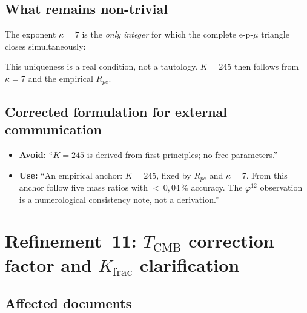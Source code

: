 \subsection*{What remains non-trivial}

The exponent $\kappa = 7$ is the \emph{only integer} for which the complete
e-p-$\mu$ triangle closes simultaneously:
\begin{center}
{\footnotesize
{}
}
\end{center}
This uniqueness is a real condition, not a tautology. $K = 245$ then follows
from $\kappa = 7$ and the empirical $R_{pe}$.

\subsection*{Corrected formulation for external communication}

\begin{itemize}
  \item \textbf{Avoid:} \enquote{$K = 245$ is derived from first principles;
        no free parameters.}
  \item \textbf{Use:} \enquote{An empirical anchor: $K = 245$, fixed by
        $R_{pe}$ and $\kappa = 7$. From this anchor follow five mass ratios
        with ${<}\,0{,}04\,\%$ accuracy. The $\varphi^{12}$ observation is a
        numerological consistency note, not a derivation.}
\end{itemize}

\section{\texorpdfstring{Refinement~11: $T_\text{CMB}$ correction factor and $K_\text{frac}$ clarification}{Refinement 11: T\_CMB correction factor and K\_frac clarification}}

\subsection*{Affected documents}

